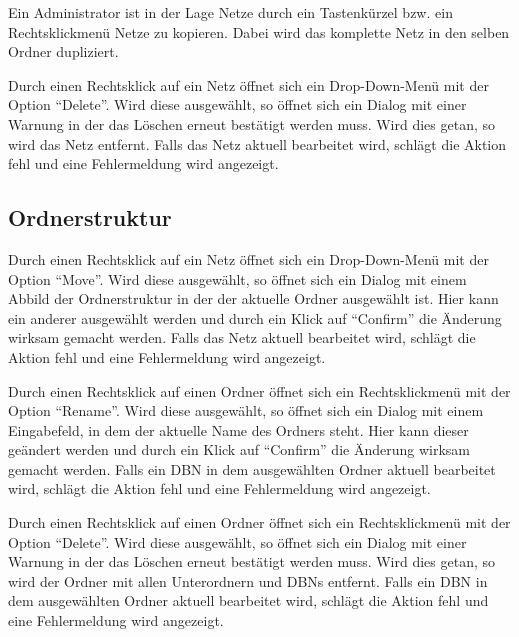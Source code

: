 \documentclass[parskip=full,11pt,twoside]{scrartcl}
\begin{document}

Ein Administrator ist in der Lage Netze durch ein Tastenkürzel bzw. ein Rechtsklickmenü Netze zu kopieren. Dabei wird das komplette Netz in den selben Ordner dupliziert.


Durch einen Rechtsklick auf ein Netz öffnet sich ein Drop-Down-Menü mit der Option \enquote{Delete}. Wird diese ausgewählt, so öffnet sich ein Dialog mit einer Warnung in der das Löschen erneut bestätigt werden muss. Wird dies getan, so wird das Netz entfernt.
Falls das Netz aktuell bearbeitet wird, schlägt die Aktion fehl und eine Fehlermeldung wird angezeigt.

\subsection{Ordnerstruktur}


Durch einen Rechtsklick auf ein Netz öffnet sich ein Drop-Down-Menü mit der Option \enquote{Move}.
Wird diese ausgewählt, so öffnet sich ein Dialog mit einem Abbild der Ordnerstruktur in der der aktuelle Ordner ausgewählt ist. Hier kann ein anderer ausgewählt werden und durch ein Klick auf \enquote{Confirm} die Änderung wirksam gemacht werden.
Falls das Netz aktuell bearbeitet wird, schlägt die Aktion fehl und eine Fehlermeldung wird angezeigt.


Durch einen Rechtsklick auf einen Ordner öffnet sich ein Rechtsklickmenü mit der Option \enquote{Rename}. Wird diese ausgewählt, so öffnet sich ein Dialog mit einem Eingabefeld, in dem der aktuelle Name des Ordners steht. Hier kann dieser geändert werden und durch ein Klick auf \enquote{Confirm} die Änderung wirksam gemacht werden.
Falls ein DBN in dem ausgewählten Ordner aktuell bearbeitet wird, schlägt die Aktion fehl und eine Fehlermeldung wird angezeigt.


Durch einen Rechtsklick auf einen Ordner öffnet sich ein Rechtsklickmenü mit der Option \enquote{Delete}. Wird diese ausgewählt, so öffnet sich ein Dialog mit einer Warnung in der das Löschen erneut bestätigt werden muss. Wird dies getan, so wird der Ordner mit allen Unterordnern und DBNs entfernt.
Falls ein DBN in dem ausgewählten Ordner aktuell bearbeitet wird, schlägt die Aktion fehl und eine Fehlermeldung wird angezeigt.
\end{document}
